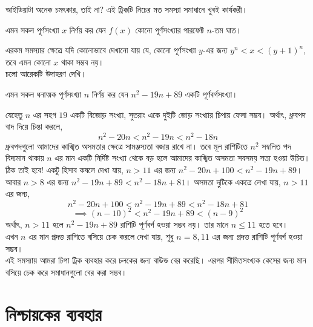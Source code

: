 \documentclass[11pt]{report}
\begin{document}
আইডিয়াটা অনেক চমৎকার, তাই না? এই ট্রিকটি নিচের মত সমস্যা সমাধানে খুবই কার্যকরী।\\

\begin{tcolorbox}[colframe=blue!80!blue]
এমন সকল পূর্ণসংখ্যা $x$ নির্ণয় কর যেন $f(x)$ কোনো পূর্ণসংখ্যার পারফেক্ট $n$-তম ঘাত।
\end{tcolorbox}

এরকম সমস্যার ক্ষেত্রে যদি কোনোভাবে দেখানো যায় যে, কোনো পূর্ণসংখ্যা $y$-এর জন্য $y^n<x<(y+1)^n$, তবে এমন কোনো $x$ থাকা সম্ভব নয়।\\

চলো আরেকটি উদাহরণ দেখি।\\

\begin{tcolorbox}[colframe=black!80!green,title=উদাহরণ 1.6.2]
এমন সকল ধনাত্মক পূর্ণসংখ্যা $n$ নির্ণয় কর যেন $n^2-19n+89$ একটি পূর্ণবর্গসংখ্যা।
\end{tcolorbox}

যেহেতু $n$ এর সহগ $19$ একটি বিজোড় সংখ্যা, সুতরাং একে দুইটি জোড় সংখ্যার চিপায় ফেলা সম্ভব। অর্থাৎ, ধ্রুবপদ বাদ দিয়ে চিন্তা করলে, $$n^2-20n<n^2-19n<n^2-18n$$ ধ্রুবপদগুলো আমাদের কাঙ্খিত অসমতার ক্ষেত্রে সামঞ্জস্যতা বজায় রাখে না। তবে মূল রাশিটিতে $n^2$ সম্বলিত পদ বিদ্যমান থাকায় $n$ এর মান একটি নির্দিষ্ট সংখ্যা থেকে বড় হলে আমাদের কাঙ্খিত অসমতা সবসময় সত্য হওয়া উচিত।\\

ঠিক তাই হবে! একটু হিসাব কষলে দেখা যায়, $n > 11$ এর জন্য $n^2-20n+100 < n^2-19n+89$। আবার $n>8$ এর জন্য $n^2-19n+89 < n^2-18n+81$। অসমতা দুটিকে একত্রে লেখা যায়, $n>11$ এর জন্য, $$n^2-20n+100 < n^2-19n+89 < n^2-18n+81$$ $$\implies (n-10)^2 < n^2-19n+89 < (n-9)^2$$ অর্থাৎ, $n>11$ হলে $n^2-19n+89$ রাশিটি পূর্ণবর্গ হওয়া সম্ভব নয়। তার মানে $n \leq 11$ হতে হবে।\\

এখন $n$ এর মান প্রদত্ত রাশিতে বসিয়ে চেক করলে দেখা যায়, শুধু $n=8,11$ এর জন্য প্রদত্ত রাশিটি পূর্ণবর্গ হওয়া সম্ভব।\\

এই সমস্যায় আমরা চিপা ট্রিক ব্যবহার করে চলকের জন্য বাউন্ড বের করেছি। এরপর সীমিতসংখ্যক কেসের জন্য মান বসিয়ে চেক করে সমাধানগুলো বের করা সম্ভব।\\

\newpage

\section{নিশ্চায়কের ব্যবহার}
\end{document}
